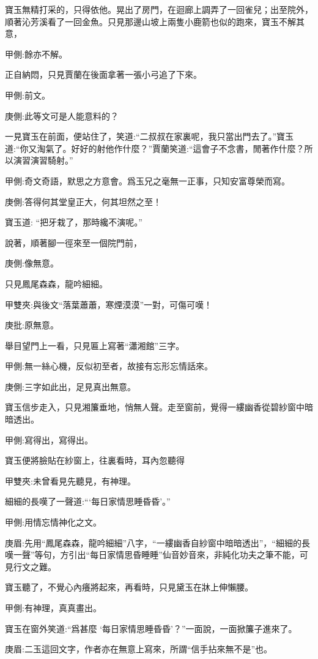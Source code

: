 \begin{parag}
    寶玉無精打采的，只得依他。晃出了房門，在迴廊上調弄了一回雀兒；出至院外，順著沁芳溪看了一回金魚。只見那邊山坡上兩隻小鹿箭也似的跑來，寶玉不解其意，\begin{note}甲側:餘亦不解。\end{note}正自納悶，只見賈蘭在後面拿著一張小弓追了下來。\begin{note}甲側:前文。\end{note}\begin{note}庚側:此等文可是人能意料的？\end{note}一見寶玉在前面，便站住了，笑道:“二叔叔在家裏呢，我只當出門去了。”寶玉道:“你又淘氣了。好好的射他作什麼？”賈蘭笑道:“這會子不念書，閒著作什麼？所以演習演習騎射。”\begin{note}甲側:奇文奇語，默思之方意會。爲玉兄之毫無一正事，只知安富尊榮而寫。\end{note}\begin{note}庚側:答得何其堂皇正大，何其坦然之至！\end{note}寶玉道: “把牙栽了，那時纔不演呢。”
\end{parag}


\begin{parag}
    說著，順著腳一徑來至一個院門前，\begin{note}庚側:像無意。\end{note}只見鳳尾森森，龍吟細細。\begin{note}甲雙夾:與後文“落葉蕭蕭，寒煙漠漠”一對，可傷可嘆！\end{note}\begin{note}庚批:原無意。\end{note}舉目望門上一看，只見匾上寫著“瀟湘館”三字。\begin{note}甲側:無一絲心機，反似初至者，故接有忘形忘情話來。\end{note}\begin{note}庚側:三字如此出，足見真出無意。\end{note}寶玉信步走入，只見湘簾垂地，悄無人聲。走至窗前，覺得一縷幽香從碧紗窗中暗暗透出。\begin{note}甲側:寫得出，寫得出。\end{note}寶玉便將臉貼在紗窗上，往裏看時，耳內忽聽得\begin{note}甲雙夾:未曾看見先聽見，有神理。\end{note}細細的長嘆了一聲道:“‘每日家情思睡昏昏’。”\begin{note}甲側:用情忘情神化之文。\end{note}\begin{note}庚眉:先用“鳳尾森森，龍吟細細”八字，“一縷幽香自紗窗中暗暗透出”，“細細的長嘆一聲”等句，方引出“每日家情思昏睡睡”仙音妙音來，非純化功夫之筆不能，可見行文之難。\end{note}寶玉聽了，不覺心內癢將起來，再看時，只見黛玉在牀上伸懶腰。\begin{note}甲側:有神理，真真畫出。\end{note}寶玉在窗外笑道:“爲甚麼 ‘每日家情思睡昏昏’？”一面說，一面掀簾子進來了。\begin{note}庚眉:二玉這回文字，作者亦在無意上寫來，所謂“信手拈來無不是”也。\end{note}
\end{parag}


